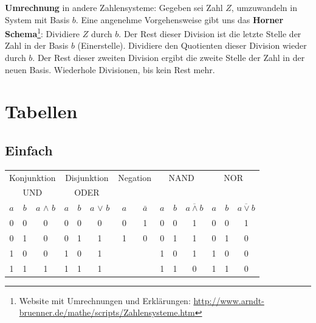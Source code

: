 \documentclass[12pt, a4paper, twopage]{scrartcl}
\begin{document}
\textbf{Umrechnung} in andere Zahlensysteme: Gegeben sei Zahl $Z$, umzuwandeln in System mit Basis $b$.
Eine angenehme Vorgehensweise gibt uns das \textbf{Horner Schema}\footnote{
Website mit Umrechnungen und Erklärungen: \url{http://www.arndt-bruenner.de/mathe/scripts/Zahlensysteme.htm}
}: Dividiere $Z$ durch $b$. Der Rest dieser Division ist die letzte Stelle der Zahl in der Basis $b$  (Einerstelle). Dividiere den Quotienten dieser Division wieder durch $b$. Der Rest dieser zweiten Division ergibt die zweite Stelle der Zahl in der neuen Basis. Wiederhole Divisionen, bis kein Rest mehr.


\section{Tabellen}
\subsection{Einfach}
\begin{center}
\begin{tabular}[c]{c | c | c || c| c | c || c | c || c | c | c || c| c| c}
\multicolumn{3}{c||}{Konjunktion}	&	\multicolumn{3}{c||}{Disjunktion} & \multicolumn{2}{c||}{Negation} & \multicolumn{3}{c||}{NAND} & \multicolumn{3}{c}{NOR}\\
\multicolumn{3}{c||}{UND}	&	\multicolumn{3}{c||}{ODER} & \multicolumn{2}{c||}{} & \multicolumn{3}{c||}{} & \multicolumn{3}{c}{}\\
\hline
$a$ & $b$ & $a$ $\wedge$ $b$ & $a$ & $b$ & $a$ $\vee$ $b$ & $a$ & $\bar{a}$ & $a$ & $b$ & $\overline{a \wedge b}$ & $a$ & $b$ & $\overline{a \vee b}$\\
\hline
0 & 0 & 0 & 0 & 0 & 0 & 0 & 1 & 0 & 0 & 1 & 0 & 0 & 1\\
0 & 1 & 0 & 0 & 1 & 1 & 1 & 0 & 0 & 1 & 1 & 0 & 1 & 0\\
1 & 0 & 0 & 1 & 0 & 1 & & & 1 & 0 & 1 & 1 & 0 & 0\\
1 & 1 & 1 & 1 & 1 & 1 & & & 1 & 1 & 0 & 1 & 1 & 0\\
\hline
\end{tabular}
\end{center}
\end{document}
